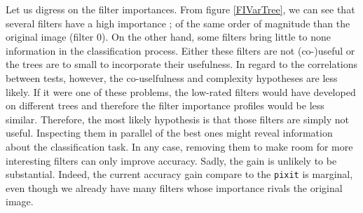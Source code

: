 \documentclass[a4paper]{report}
\begin{document}
		\par
		Let us digress on the filter importances. From figure \ref{FIVarTree}, we can see that several filters have a high importance ; of the same order of magnitude than the original image (filter 0). On the other hand, some filters bring little to none information in the classification process. Either these filters are not (co-)useful or the trees are to small to incorporate their usefulness. In regard to the correlations between tests, however, the co-uselfulness and complexity hypotheses are less likely. If it were one of these problems, the low-rated filters would have developed on different trees and therefore the filter importance profiles would be less similar. Therefore, the most likely hypothesis is that those filters are simply not useful. Inspecting them in parallel of the best ones might reveal information about the classification task. In any case, removing them to make room for more interesting filters can only improve accuracy. Sadly, the gain is unlikely to be substantial. Indeed, the current accuracy gain compare to the \texttt{pixit} is marginal, even though we already have many filters whose importance rivals the original image.
		
\end{document}
